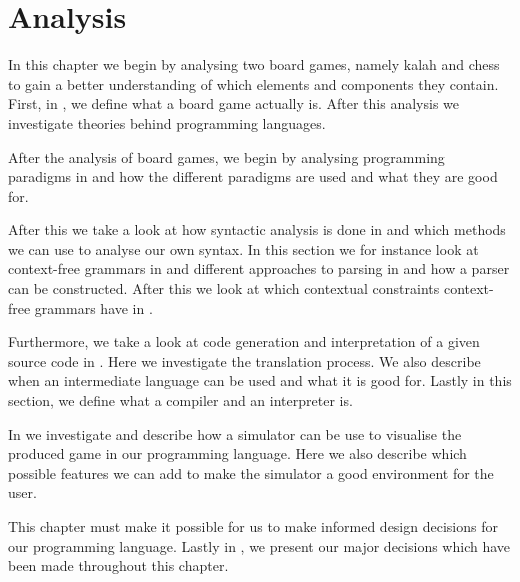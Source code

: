 \chapter{Analysis}
\label{chap:analysis}

In this chapter we begin by analysing two board games, namely kalah and chess to
gain a better understanding of which elements and components they contain.
First, in , we define what a board game actually
is. After this analysis we investigate theories
behind programming languages. 

After the analysis of board games, we begin by analysing programming paradigms
in  and how the different paradigms are used and what they
are good for. 

After this we take a look at how syntactic analysis is done in
 and which methods we can use to analyse our own
syntax. In this section we for instance look at context-free grammars in and
different approaches to parsing in and how a parser can be constructed. After
this we look at which contextual constraints context-free grammars have in
.

Furthermore, we take a look at code generation and interpretation of a given
source code in . Here we investigate
the translation process. We also describe when an intermediate language can be
used and what it is good for. Lastly in this section, we define what a compiler
and an interpreter is.

In  we investigate and describe how a simulator can be use
to visualise the produced game in our programming language. Here we also
describe which possible features we can add to make the simulator a good
environment for the user.

This chapter must make it possible for us to make informed design decisions for
our programming language. Lastly in , we present
our major decisions which have been made throughout this chapter.









